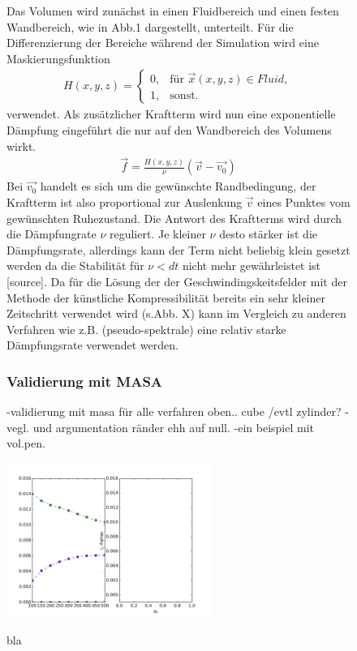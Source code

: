 \begin{figure}[!tpb]
Das Volumen wird zunächst in einen Fluidbereich und einen festen Wandbereich, wie in Abb.1 dargestellt, unterteilt. Für die Differenzierung der Bereiche während der Simulation wird  eine Maskierungsfunktion
\begin{align}
H(x, y, z) = \begin{cases}
                    0, & \text{für } \vec{x}(x,y,z) \in Fluid, \\
                    1, & \text{sonst}.
             \end{cases}
\end{align}
verwendet. Als zusätzlicher Kraftterm wird nun eine exponentielle Dämpfung eingeführt die nur auf den Wandbereich des Volumens wirkt.
\begin{align}
\vec{f} = \frac{H(x, y, z)}{\nu}(\vec{v} - \vec{v_0})
\end{align}
Bei $\vec{v_0}$ handelt es sich um die gewünschte Randbedingung, der Kraftterm ist also proportional zur Auslenkung $\vec{v}$ eines Punktes vom gewünschten Ruhezustand.
Die Antwort des Kraftterms wird durch die Dämpfungrate $\nu$ reguliert. Je kleiner $\nu$ desto stärker ist die Dämpfungsrate, allerdings kann der Term
nicht beliebig klein gesetzt werden da die Stabilität für $\nu < dt$ nicht mehr gewährleistet ist [source].
Da für die Lösung der der Geschwindingskeitsfelder mit der Methode der künstliche Kompressibilität  bereits ein sehr kleiner Zeitschritt verwendet wird (s.Abb. X)
kann im Vergleich zu anderen Verfahren wie z.B. (pseudo-spektrale) eine relativ starke Dämpfungsrate verwendet werden.

\subsubsection{Validierung mit MASA}
-validierung mit masa für alle verfahren oben.. cube /evtl zylinder?
-vegl. und argumentation ränder ehh auf null.
-ein beispiel mit vol.pen.

  \includegraphics[width=0.6\textwidth]{gfx/immersed_boundary/dfo2o4.png}\label{fig:df_o2o4}
  \caption{bla}
\end{figure}

